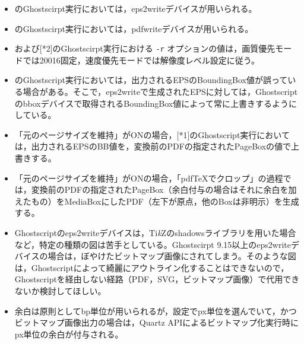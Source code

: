 \documentclass[uplatex,dvipdfmx,landscape]{jsarticle}
\newcommand*\TikZ{Ti\textit{k}Z}
\begin{document}
\begin{center}
\end{center}

\vspace{5mm}



{\baselineskip18pt
\begin{itemize}[leftmargin=2zw]
\item\relax[*1]のGhostscirpt実行においては，eps2writeデバイスが用いられる。
\item\relax[*2]のGhostscirpt実行においては，pdfwriteデバイスが用いられる。
\item\relax[*1]および[*2]のGhostscirpt実行における \texttt{-r} オプションの値は，画質優先モードでは20016固定，速度優先モードでは解像度レベル設定に従う。
\item\relax[*1]のGhostscript実行においては，出力されるEPSのBoundingBox値が誤っている場合がある。そこで，eps2writeで生成されたEPSに対しては，Ghostscriptのbboxデバイスで取得されるBoundingBox値によって常に上書きするようにしている。
\item 「元のページサイズを維持」がONの場合，[*1]のGhostscript実行においては，出力されるEPSのBB値を，変換前のPDFの指定されたPageBoxの値で上書きする。
\item 「元のページサイズを維持」がONの場合，「pdf\TeX でクロップ」の過程では，変換前のPDFの指定されたPageBox（余白付与の場合はそれに余白を加えたもの）をMediaBoxにしたPDF（左下が原点，他のBoxは非明示）を生成する。
\item Ghostscriptのeps2writeデバイスは，\TikZ のshadowsライブラリを用いた場合など，特定の種類の図は苦手としている。Ghostscirpt 9.15以上のeps2writeデバイスの場合は，ぼやけたビットマップ画像にされてしまう。そのような図は，Ghostscriptによって綺麗にアウトライン化することはできないので，Ghostscriptを経由しない経路（PDF，SVG，ビットマップ画像）で代用できないか検討してほしい。
\item 余白は原則としてbp単位が用いられるが，設定でpx単位を選んでいて，かつビットマップ画像出力の場合は，Quartz APIによるビットマップ化実行時にpx単位の余白が付与される。
\end{itemize}
}
\end{document}
